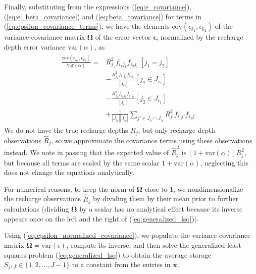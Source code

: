 \documentclass[11pt,a4paper]{article}
\renewcommand{\vec}[1]{\mathbf{#1}}
\begin{document}
Finally, substituting from the expressions (\ref{eq:e_covariance}),
(\ref{eq:e_beta_covariance}) and (\ref{eq:beta_covariance}) for terms
in (\ref{eq:epsilon_covariance_terms}), we have the elements
$\text{cov}\left(\epsilon_{k_1}, \epsilon_{k_2} \right)$ of the
variance-covariance matrix $\bm{\Omega}$ of the error vector
$\mathbf{\epsilon}$, normalized by the recharge depth error variance
$\text{var}(\alpha)$, as
\begin{align}
\begin{split}
\label{eq:epsilon_normalized_covariance}
  \frac{\text{cov}\left(\epsilon_{k_1}, \epsilon_{k_2}\right)}{\text{var}(\alpha)} =
  &R_{j_1}^2 f_{i_1 j_1} f_{i_2 j_1}\, [j_1 = j_2] \\
  &- \frac{R_{j_1}^2 f_{i_1 j_1} f_{i_2 j_1}}{|J_{i_2}|} [j_1 \in J_{i_2}]\\
  &- \frac{R_{j_2}^2 f_{i_2 j_2} f_{i_1 j_2}}{|J_{i_1}|} [j_2 \in J_{i_1}]\\
  &+ \frac{1}{|J_{i_1}| |J_{i_2}|} \sum_{j' \in J_{i_1}\cap J_{i_2}} R_{j'}^2 f_{i_1 j'} f_{i_2 j'}
\end{split}
\end{align}
We do not have the true recharge depths $R_j$, but only recharge depth
observations $\widehat{R}_j$, so we approximate the covariance terms
using these observations instead.  We note in passing that the
expected value of $\widehat{R}_j^2$ is
$[1 + \text{var}(\alpha)]R_j^2$, but because all terms are scaled by
the same scalar $1 + \text{var}(\alpha)$, neglecting this does not
change the equations analytically.

For numerical reasons, to keep the
norm of $\bm{\Omega}$ close to 1, we nondimensionalize the recharge
observations $\widehat{R}_j$ by dividing them by their mean prior to
further calculations (dividing $\bm{\Omega}$ by a scalar has no
analytical effect because its inverse appears once on the left and the
right of (\ref{eq:generalized_lsq})).

Using (\ref{eq:epsilon_normalized_covariance}), we populate the
variance-covariance matrix
$\bm{\Omega} = \text{var}(\mathbb\epsilon)$, compute its inverse, and
then solve the generalized least-squares problem
(\ref{eq:generalized_lsq}) to obtain the average storage
$S_j, j \in \{1, 2, \ldots, J - 1\}$ to a constant from the entries in
$\vec{x}$.
\end{document}
